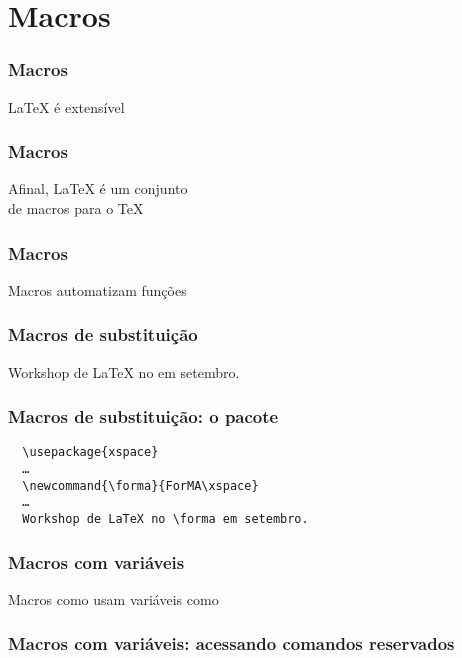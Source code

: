 \section{Macros}

\begin{frame}
  \frametitle{Macros}
  \LARGE
  \LaTeX{} é extensível
\end{frame}

\begin{frame}
  \frametitle{Macros}
  \LARGE
  Afinal, \LaTeX{} é um conjunto\\ de macros para o \TeX
\end{frame}

\begin{frame}
  \frametitle{Macros}
  \LARGE
  Macros automatizam funções
\end{frame}

\begin{frame}[fragile]
  \frametitle{Macros de substituição}
  \LARGE
  \latexcode{\newcommand{\forma}{ForMA}}
  \vspace{1em}

  Workshop de LaTeX no \latexcode{\forma{}} em setembro.
\end{frame}

\begin{frame}[fragile]
  \frametitle{Macros de substituição: o pacote }
  \begin{verbatim}
  \usepackage{xspace}
  …
  \newcommand{\forma}{ForMA\xspace}
  …
  Workshop de LaTeX no \forma em setembro.
  \end{verbatim}
\end{frame}

\begin{frame}
  \frametitle{Macros com variáveis}
  \LARGE
  Macros como \latexcode{\maketitle} usam variáveis como
  \latexcode{\@author}
\end{frame}

\begin{frame}
  \frametitle{Macros com variáveis: acessando comandos reservados}
  \LARGE
\end{frame}

